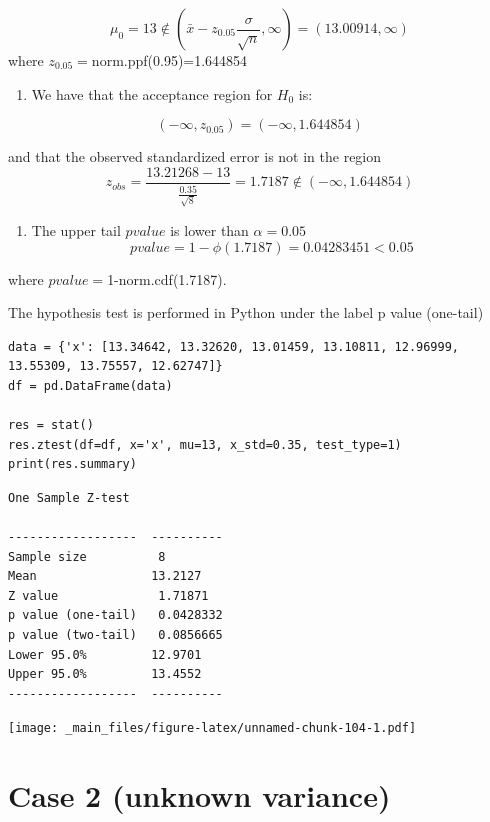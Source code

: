 \documentclass[
]{book}
\providecommand{\tightlist}{%
  \setlength{\itemsep}{0pt}\setlength{\parskip}{0pt}}
\begin{document}
\[\mu_0=13 \notin (\bar{x}-z_{0.05} \frac{\sigma}{\sqrt{n}}, \infty)=(13.00914, \infty)\]
where \(z_{0.05}=\)norm.ppf(0.95)=1.644854

\begin{enumerate}
\def\labelenumi{\arabic{enumi}.}
\setcounter{enumi}{1}
\tightlist
\item
  We have that the acceptance region for \(H_0\) is:
\end{enumerate}

\[(-\infty, z_{0.05})=( -\infty,  1.644854)\]

and that the observed standardized error is not in the region
\[z_{obs} =  \frac{13.21268-13}{\frac{0.35}{\sqrt{8}}}=1.7187 \notin ( -\infty,  1.644854)\]

\begin{enumerate}
\def\labelenumi{\arabic{enumi}.}
\setcounter{enumi}{2}
\tightlist
\item
  The upper tail \(pvalue\) is lower than \(\alpha=0.05\)
  \[pvalue=1-\phi(1.7187)=0.04283451 <0.05\]
\end{enumerate}

where \(pvalue=\)1-norm.cdf(1.7187).

The hypothesis test is performed in Python under the label p value (one-tail)

\begin{verbatim}
data = {'x': [13.34642, 13.32620, 13.01459, 13.10811, 12.96999, 13.55309, 13.75557, 12.62747]}
df = pd.DataFrame(data)

res = stat()
res.ztest(df=df, x='x', mu=13, x_std=0.35, test_type=1)
print(res.summary)
\end{verbatim}

\begin{verbatim}
One Sample Z-test 

------------------  ----------
Sample size          8
Mean                13.2127
Z value              1.71871
p value (one-tail)   0.0428332
p value (two-tail)   0.0856665
Lower 95.0%         12.9701
Upper 95.0%         13.4552
------------------  ----------
\end{verbatim}

\texttt{[image: \_main\_files/figure-latex/unnamed-chunk-104-1.pdf]}

\hypertarget{case-2-unknown-variance-1}{%
\section{Case 2 (unknown variance)}\label{case-2-unknown-variance-1}}
\end{document}
